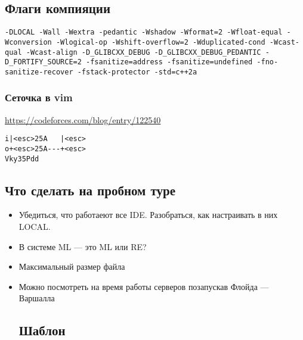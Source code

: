 \subsection{Флаги компияции}
\texttt{-DLOCAL -Wall -Wextra -pedantic -Wshadow -Wformat=2 -Wfloat-equal -Wconversion -Wlogical-op -Wshift-overflow=2 -Wduplicated-cond -Wcast-qual -Wcast-align -D\_GLIBCXX\_DEBUG -D\_GLIBCXX\_DEBUG\_PEDANTIC -D\_FORTIFY\_SOURCE=2 -fsanitize=address -fsanitize=undefined -fno-sanitize-recover -fstack-protector -std=c++2a}
\subsubsection{Сеточка в vim}
\underline{\url{https://codeforces.com/blog/entry/122540}}

\begin{lstlisting}
i|<esc>25A   |<esc>
o+<esc>25A---+<esc>
Vky35Pdd
\end{lstlisting}
\subsection{Что сделать на пробном туре}
\begin{itemize}
\item Убедиться, что работаеют все IDE.
Разобраться, как настраивать в них LOCAL.
\item В системе ML --- это ML или RE?
\item Максимальный размер файла
\item Можно посмотреть на время работы серверов позапускав Флойда --- Варшалла
\subsection{Шаблон}

\end{itemize}